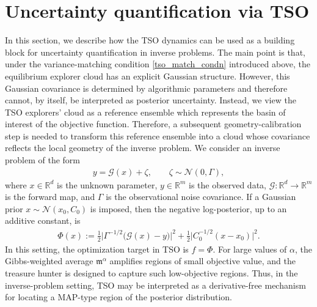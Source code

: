 \documentclass{article}
\numberwithin{equation}{section}
\begin{document}
 \section{Uncertainty quantification via TSO}
\label{tso_sec_uq}
In this section, we describe how the TSO dynamics can be used as a building block for uncertainty quantification in inverse problems. The main point is that, under the variance-matching condition \eqref{tso_match_condn} introduced above, the equilibrium explorer cloud has an explicit Gaussian structure. However, this Gaussian covariance is determined by algorithmic parameters and therefore cannot, by itself, be interpreted as posterior uncertainty. Instead, we view the TSO explorers' cloud  as a reference ensemble which represents the basin of interest of the objective function. Therefore, a subsequent geometry-calibration step is needed to transform this reference ensemble into a cloud whose covariance reflects the local geometry of the inverse problem. We consider an inverse problem of the form
\begin{align}
y = \mathcal{G}(x) + \zeta,
\qquad
\zeta\sim \mathcal N(0,\Gamma),
\end{align}
where $x\in\mathbb R^d$ is the unknown parameter, $y\in\mathbb R^m$ is the observed data, $\mathcal G:\mathbb R^d\to\mathbb R^m$ is the forward map, and $\Gamma$ is the observational noise covariance. If a Gaussian prior $x\sim\mathcal N(x_0,C_0)$ is imposed, then the negative log-posterior, up to an additive constant, is
\begin{align}
\Phi(x) :=
\frac{1}{2}
\big|\Gamma^{-1/2}\bigl(\mathcal G(x)-y\bigr)\big|^2
+ \frac12 \big|C_0^{-1/2}(x-x_0)\big|^2 .
\label{eq:tso_uq_phi}
\end{align}
In this setting, the optimization target in TSO is $f=\Phi$. For large values of  $\alpha$, the Gibbs-weighted average $\mathfrak m^\alpha$ amplifies regions of small objective value, and the treasure hunter is designed to capture such low-objective regions. Thus, in the inverse-problem setting, TSO may be interpreted as a derivative-free mechanism for locating a MAP-type region of the posterior distribution.
\end{document}

